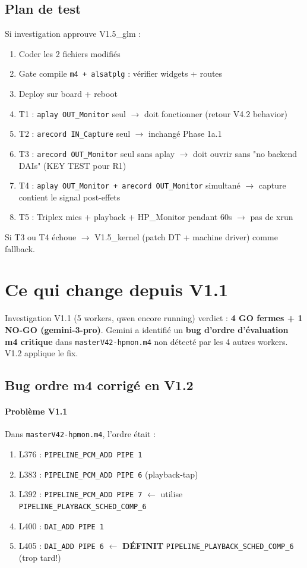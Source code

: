 \documentclass[11pt,a4paper]{article}
\begin{document}
\subsection{Plan de test}

Si investigation approuve V1.5\_glm :
\begin{enumerate}[leftmargin=*, itemsep=1pt]
  \item Coder les 2 fichiers modifiés
  \item Gate compile \texttt{m4 + alsatplg} : vérifier widgets + routes
  \item Deploy sur board + reboot
  \item T1 : \texttt{aplay OUT\_Monitor} seul $\to$ doit fonctionner (retour V4.2 behavior)
  \item T2 : \texttt{arecord IN\_Capture} seul $\to$ inchangé Phase 1a.1
  \item T3 : \texttt{arecord OUT\_Monitor} seul sans aplay $\to$ doit ouvrir sans "no backend DAIs" (KEY TEST pour R1)
  \item T4 : \texttt{aplay OUT\_Monitor + arecord OUT\_Monitor} simultané $\to$ capture contient le signal post-effets
  \item T5 : Triplex mics + playback + HP\_Monitor pendant 60s $\to$ pas de xrun
\end{enumerate}

Si T3 ou T4 échoue $\to$ V1.5\_kernel (patch DT + machine driver) comme fallback.

\section{Ce qui change depuis V1.1}

Investigation V1.1 (5 workers, qwen encore running) verdict : \textbf{4 GO fermes + 1 NO-GO (gemini-3-pro)}. Gemini a identifié un \textbf{bug d'ordre d'évaluation m4 critique} dans \texttt{masterV42-hpmon.m4} non détecté par les 4 autres workers. V1.2 applique le fix.

\subsection{Bug ordre m4 corrigé en V1.2}

\paragraph{Problème V1.1} Dans \texttt{masterV42-hpmon.m4}, l'ordre était :
\begin{enumerate}[leftmargin=*, itemsep=1pt]
  \item L376 : \texttt{PIPELINE\_PCM\_ADD PIPE 1}
  \item L383 : \texttt{PIPELINE\_PCM\_ADD PIPE 6} (playback-tap)
  \item L392 : \texttt{PIPELINE\_PCM\_ADD PIPE 7} $\leftarrow$ utilise \texttt{PIPELINE\_PLAYBACK\_SCHED\_COMP\_6}
  \item L400 : \texttt{DAI\_ADD PIPE 1}
  \item L405 : \texttt{DAI\_ADD PIPE 6} $\leftarrow$ \textbf{DÉFINIT} \texttt{PIPELINE\_PLAYBACK\_SCHED\_COMP\_6} (trop tard!)
\end{enumerate}
\end{document}
